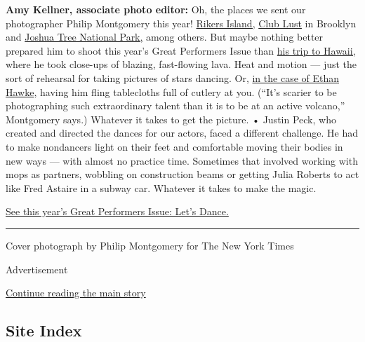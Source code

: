 \textbf{Amy Kellner, associate photo editor:} Oh, the places we sent our
photographer Philip Montgomery this year!
\href{https://www.nytimes3xbfgragh.onion/interactive/2018/06/07/magazine/new-york-love-rikers-jail-visit.html}{Rikers
Island,}
\href{https://www.nytimes3xbfgragh.onion/interactive/2018/06/07/magazine/new-york-love-club-lust.html}{Club
Lust} in Brooklyn and
\href{https://www.nytimes3xbfgragh.onion/interactive/2018/03/22/magazine/voyages-joshua-tree-lost-hiker.html}{Joshua
Tree National Park,} among others. But maybe nothing better prepared him
to shoot this year's Great Performers Issue than
\href{https://www.nytimes3xbfgragh.onion/interactive/2018/09/21/magazine/voyages-travel-sounds-from-the-world.html}{his
trip to Hawaii,} where he took close-ups of blazing, fast-flowing lava.
Heat and motion --- just the sort of rehearsal for taking pictures of
stars dancing. Or,
\href{https://www.nytimes3xbfgragh.onion/interactive/2018/12/05/magazine/great-performers-dance-photos.html}{in
the case of Ethan Hawke}, having him fling tablecloths full of cutlery
at you. (``It's scarier to be photographing such extraordinary talent
than it is to be at an active volcano,'' Montgomery says.) Whatever it
takes to get the picture. • Justin Peck, who created and directed the
dances for our actors, faced a different challenge. He had to make
nondancers light on their feet and comfortable moving their bodies in
new ways --- with almost no practice time. Sometimes that involved
working with mops as partners, wobbling on construction beams or getting
Julia Roberts to act like Fred Astaire in a subway car. Whatever it
takes to make the magic.

\href{https://www.nytimes3xbfgragh.onion/interactive/2018/12/05/magazine/great-performers-justin-peck-dance.html}{See
this year's Great Performers Issue: Let's Dance.}

\begin{center}\rule{0.5\linewidth}{\linethickness}\end{center}

Cover photograph by Philip Montgomery for The New York Times

Advertisement

\protect\hyperlink{after-bottom}{Continue reading the main story}

\hypertarget{site-index}{%
\subsection{Site Index}\label{site-index}}

